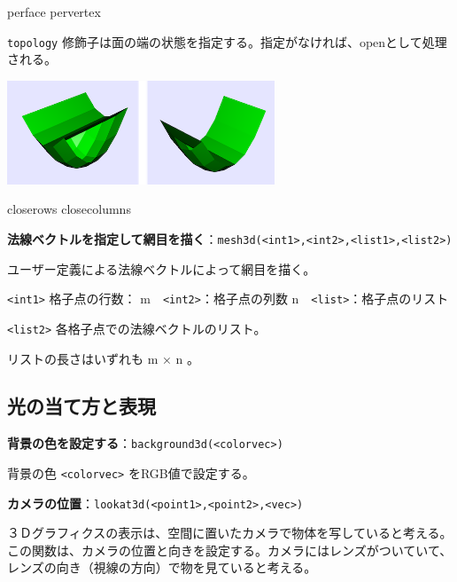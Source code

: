 \documentclass[papersize,a4paper,12pt,uplatex]{jsarticle}
\begin{document}
\hspace{35mm} perface \hspace{25mm} pervertex 

\vspace{\baselineskip}
\verb|topology| 修飾子は面の端の状態を指定する。指定がなければ、openとして処理される。

\vspace{\baselineskip}
 

\hspace{20mm} \includegraphics[bb=0 0 600 232 , width=8cm]{Cfig/topology.png}

\hspace{30mm} closerows \hspace{25mm} closecolumns 
 
\vspace{\baselineskip}
\noindent
{\bf 法線ベクトルを指定して網目を描く}：\verb|mesh3d(<int1>,<int2>,<list1>,<list2>)|

ユーザー定義による法線ベクトルによって網目を描く。

\verb|<int1>| 格子点の行数： m　\verb|<int2>|：格子点の列数 n　\verb|<list>|：格子点のリスト

\verb|<list2>| 各格子点での法線ベクトルのリスト。

リストの長さはいずれも m × n 。

\vspace{\baselineskip}
 

\subsection{光の当て方と表現}

\hypertarget{background3d}{}
\vspace{\baselineskip}
\noindent
{\bf 背景の色を設定する}：\verb|background3d(<colorvec>)|

背景の色 \verb|<colorvec>| をRGB値で設定する。

\hypertarget{lookat3d}{}
\vspace{\baselineskip}
\noindent
{\bf カメラの位置}：\verb|lookat3d(<point1>,<point2>,<vec>)|

３Ｄグラフィクスの表示は、空間に置いたカメラで物体を写していると考える。この関数は、カメラの位置と向きを設定する。カメラにはレンズがついていて、レンズの向き（視線の方向）で物を見ていると考える。
\end{document}
